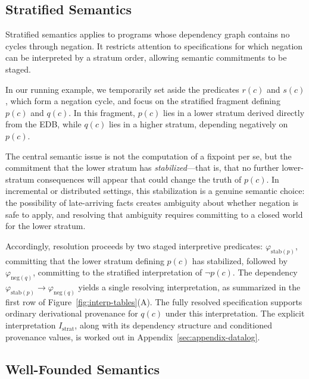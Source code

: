 \documentclass[acmsmall,nonacm]{acmart}
\theoremstyle{remark}
\numberwithin{definition}{section}
\numberwithin{theorem}{section}
\numberwithin{lemma}{section}
\numberwithin{corollary}{section}
\numberwithin{remark}{section}
\numberwithin{example}{section}
\numberwithin{observation}{section}
\numberwithin{assumption}{section}
\begin{document}
\subsection{Stratified Semantics}

Stratified semantics applies to programs whose dependency graph contains no cycles
through negation.
It restricts attention to specifications for which negation can be interpreted by
a stratum order, allowing semantic commitments to be staged.

In our running example, we temporarily set aside the predicates $r(c)$ and $s(c)$,
which form a negation cycle, and focus on the stratified fragment defining $p(c)$
and $q(c)$.
In this fragment, $p(c)$ lies in a lower stratum derived directly from the EDB,
while $q(c)$ lies in a higher stratum, depending negatively on $p(c)$.

The central semantic issue is not the computation of a fixpoint per se, but the
commitment that the lower stratum has \emph{stabilized}—that is, that no further
lower-stratum consequences will appear that could change the truth of $p(c)$.
In incremental or distributed settings, this stabilization is a genuine semantic
choice: the possibility of late-arriving facts creates ambiguity about whether
negation is safe to apply, and resolving that ambiguity requires committing to a
closed world for the lower stratum.

Accordingly, resolution proceeds by two staged interpretive predicates:
$\varphi_{\mathrm{stab}(p)}$, committing that the lower stratum defining $p(c)$ has
stabilized, followed by $\varphi_{\mathrm{neg}(q)}$, committing to the stratified
interpretation of $\neg p(c)$.
The dependency $\varphi_{\mathrm{stab}(p)} \rightarrow \varphi_{\mathrm{neg}(q)}$
yields a single resolving interpretation, as summarized in the first row of
Figure~\ref{fig:interp-tables}(A).
The fully resolved specification supports ordinary derivational provenance for
$q(c)$ under this interpretation.
The explicit interpretation $I_{\mathrm{strat}}$, along with its dependency
structure and conditioned provenance values, is worked out in
Appendix~\ref{sec:appendix-datalog}.

\subsection{Well-Founded Semantics}
\end{document}

